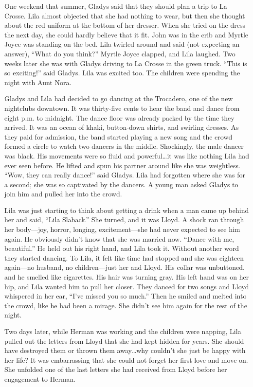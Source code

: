 \documentclass[
  letterpaper,
]{book}
\begin{document}
One weekend that summer, Gladys said that they should plan a trip to La
Crosse. Lila almost objected that she had nothing to wear, but then she
thought about the red uniform at the bottom of her dresser. When she
tried on the dress the next day, she could hardly believe that it fit.
John was in the crib and Myrtle Joyce was standing on the bed. Lila
twirled around and said (not expecting an answer), ``What do you
think?'' Myrtle Joyce clapped, and Lila laughed. Two weeks later she was
with Gladys driving to La Crosse in the green truck. ``This is so
exciting!'' said Gladys. Lila was excited too. The children were
spending the night with Aunt Nora.

Gladys and Lila had decided to go dancing at the Trocadero, one of the
new nightclubs downtown. It was thirty-five cents to hear the band and
dance from eight p.m. to midnight. The dance floor was already packed by
the time they arrived. It was an ocean of khaki, button-down shirts, and
swirling dresses. As they paid for admission, the band started playing a
new song and the crowd formed a circle to watch two dancers in the
middle. Shockingly, the male dancer was black. His movements were so
fluid and powerful\ldots it was like nothing Lila had ever seen before.
He lifted and spun his partner around like she was weightless. ``Wow,
they can really dance!'' said Gladys. Lila had forgotten where she was
for a second; she was so captivated by the dancers. A young man asked
Gladys to join him and pulled her into the crowd.

Lila was just starting to think about getting a drink when a man came up
behind her and said, ``Lila Slaback.'' She turned, and it was Lloyd. A
shock ran through her body---joy, horror, longing, excitement---she had
never expected to see him again. He obviously didn't know that she was
married now. ``Dance with me, beautiful.'' He held out his right hand,
and Lila took it. Without another word they started dancing. To Lila, it
felt like time had stopped and she was eighteen again---no husband, no
children---just her and Lloyd. His collar was unbuttoned, and he smelled
like cigarettes. His hair was turning gray. His left hand was on her
hip, and Lila wanted him to pull her closer. They danced for two songs
and Lloyd whispered in her ear, ``I've missed you so much.'' Then he
smiled and melted into the crowd, like he had been a mirage. She didn't
see him again for the rest of the night.

Two days later, while Herman was working and the children were napping,
Lila pulled out the letters from Lloyd that she had kept hidden for
years. She should have destroyed them or thrown them away\ldots why
couldn't she just be happy with her life? It was embarrassing that she
could not forget her first love and move on. She unfolded one of the
last letters she had received from Lloyd before her engagement to
Herman.
\end{document}
